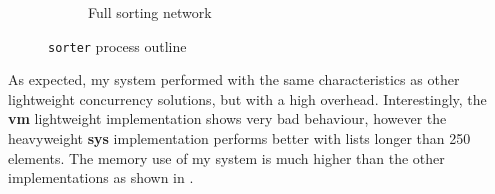 \documentclass[12pt,twoside,notitlepage]{report}
\begin{document}
\begin{figure}
\begin{subfigure}[b]{0.45\linewidth}
\caption{Full sorting network}
\label{fig:sorter_process_full}
\end{subfigure}
\cprotect\caption{\verb|sorter| process outline}
\label{fig:sorter_process_outline}
\end{figure}

As expected, my system performed with the same characteristics as other lightweight concurrency solutions, but with a high overhead. Interestingly, the \textbf{vm} lightweight implementation shows very bad behaviour, however the heavyweight \textbf{sys} implementation performs better with lists longer than 250 elements. The memory use of my system is much higher than the other implementations as shown in .
\end{document}
